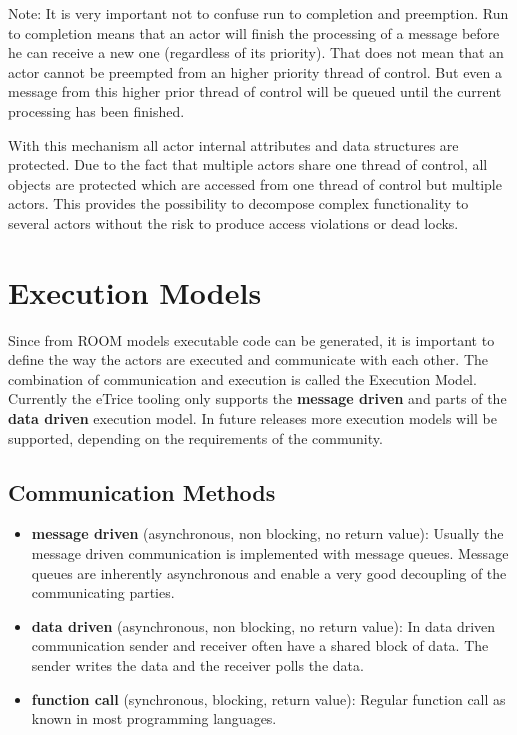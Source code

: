 Note: It is very important not to confuse run to completion and preemption. Run to completion means that an actor will finish the processing of a message before he can receive a new one (regardless of its priority). That does not mean that an actor cannot be preempted from an higher priority thread of control. But even a message from this higher prior thread of control will be queued until the current processing has been finished. 

With this mechanism all actor internal attributes and data structures are protected. Due to the fact that multiple actors share one thread of control, all objects are protected which are accessed from one thread of control but multiple actors. This provides the possibility to decompose complex functionality to several actors without the risk to produce access violations or dead locks.

\section{Execution Models}

Since from ROOM models executable code can be generated, it is important to define the way the actors are executed and communicate with each other. The combination of communication and execution is called the Execution Model.
Currently the eTrice tooling only supports the \textbf{message driven} and parts of the \textbf{data driven} execution model. In future releases more execution models will be supported, depending on the requirements of the community.

\subsection{Communication Methods}

\begin{itemize}
\item \textbf{message driven} (asynchronous, non blocking, no return value): Usually the message driven communication is implemented with message queues. Message queues are inherently asynchronous and enable a very good decoupling of the communicating parties.
\item \textbf{data driven} (asynchronous, non blocking, no return value): In data driven communication sender and receiver often have a shared block of data. The sender writes the data and the receiver polls the data.
\item \textbf{function call} (synchronous, blocking, return value): Regular function call as known in most programming languages.
\end{itemize}

